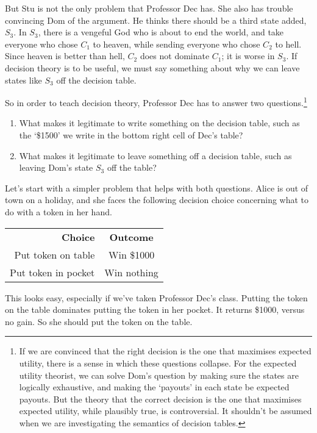 But Stu is not the only problem that Professor Dec has. She also has trouble convincing Dom of the argument. He thinks there should be a third state added, $S_3$. In $S_3$, there is a vengeful God who is about to end the world, and take everyone who chose $C_1$ to heaven, while sending everyone who chose $C_2$ to hell. Since heaven is better than hell, $C_2$ does not dominate $C_1$; it is worse in $S_3$. If decision theory is to be useful, we must say something about why we can leave states like $S_3$ off the decision table.

So in order to teach decision theory, Professor Dec has to answer two questions.\footnote{If we are convinced that the right decision is the one that maximises expected utility, there is a sense in which these questions collapse. For the expected utility theorist, we can solve Dom's question by making sure the states are logically exhaustive, and making the `payouts' in each state be expected payouts. But the theory that the correct decision is the one that maximises expected utility, while plausibly true, is controversial. It shouldn't be assumed when we are investigating the semantics of decision tables.}

\begin{enumerate}
\item What makes it legitimate to write something on the decision table, such as the `\$1500' we write in the bottom right cell of Dec's table?
\item What makes it legitimate to leave something off a decision table, such as leaving Dom's state $S_3$ off the table?
\end{enumerate}

\noindent Let's start with a simpler problem that helps with both questions. Alice is out of town on a holiday, and she faces the following decision choice concerning what to do with a token in her hand.

\begin{center}
\begin{tabular}{r c}
\textbf{Choice} & \textbf{Outcome} \\
Put token on table & Win \$1000 \\
Put token in pocket & Win nothing
\end{tabular}
\end{center}

\noindent This looks easy, especially if we've taken Professor Dec's class. Putting the token on the table dominates putting the token in her pocket. It returns \$1000, versus no gain. So she should put the token on the table.

